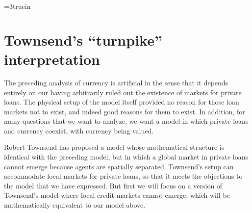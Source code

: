 
\centerline{\epsfxsize=3truein}
\caption{The trade-off between time $t$ and time $(t+1)$ consumption faced
by agent $o(e)$ in equilibrium for $t$ even (odd).  For $t$ even,
$c_t^o =c_0$, $c_{t+1}^o=1-c_0$, $m_t^o=p (1-c_0)$, and $m_{t+1}^o=0$.
The slope of the indifference curve at $X$ is
$-u'(c_t^h)/\be u'(c_{t+1}^h)=-u'(c_0)/\be u'(1-c_0)=-1$, and the slope of
the indifference curve at $Y$ is $-u'(1-c_0)/\beta u'(c_0)=-1/\beta^2$.}
\endfigure
{}
\section{Townsend's ``turnpike'' interpretation}
The preceding analysis of currency is artificial in the sense that it depends
entirely on our having arbitrarily ruled out the existence of markets for
private loans.  The physical setup of the model itself provided no reason for
those loan markets not to exist, and indeed good reasons for them to exist.
In addition, for many questions that we want to analyze, we want a model in
which private loans and currency coexist, with currency being
valued.

Robert Townsend has proposed a model whose mathematical structure is
identical with the preceding model, but in which a global market in
private loans cannot emerge because agents are spatially separated.
Townsend's setup can accommodate local markets for private loans,
so that it meets the objections to the model that we have expressed.
But first we will focus on a version of Townsend's model where
local credit markets cannot emerge, which will be mathematically equivalent
to our model above.

